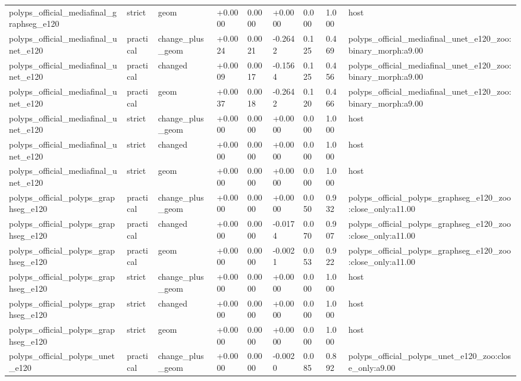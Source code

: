 \begin{table}[t]
\begin{tabular}{lllllllll}
polyps\_official\_mediafinal\_graphseg\_e120 & strict & geom & +0.0000 & 0.0000 & +0.0000 & 0.000 & 1.000 & host \\
polyps\_official\_mediafinal\_unet\_e120 & practical & change\_plus\_geom & +0.0024 & 0.0021 & -0.2642 & 0.125 & 0.469 & polyps\_official\_mediafinal\_unet\_e120\_zoo:binary\_morph:a9.00 \\
polyps\_official\_mediafinal\_unet\_e120 & practical & changed & +0.0009 & 0.0017 & -0.1564 & 0.125 & 0.456 & polyps\_official\_mediafinal\_unet\_e120\_zoo:binary\_morph:a9.00 \\
polyps\_official\_mediafinal\_unet\_e120 & practical & geom & +0.0037 & 0.0018 & -0.2642 & 0.120 & 0.466 & polyps\_official\_mediafinal\_unet\_e120\_zoo:binary\_morph:a9.00 \\
polyps\_official\_mediafinal\_unet\_e120 & strict & change\_plus\_geom & +0.0000 & 0.0000 & +0.0000 & 0.000 & 1.000 & host \\
polyps\_official\_mediafinal\_unet\_e120 & strict & changed & +0.0000 & 0.0000 & +0.0000 & 0.000 & 1.000 & host \\
polyps\_official\_mediafinal\_unet\_e120 & strict & geom & +0.0000 & 0.0000 & +0.0000 & 0.000 & 1.000 & host \\
polyps\_official\_polyps\_graphseg\_e120 & practical & change\_plus\_geom & +0.0000 & 0.0000 & +0.0000 & 0.050 & 0.932 & polyps\_official\_polyps\_graphseg\_e120\_zoo:close\_only:a11.00 \\
polyps\_official\_polyps\_graphseg\_e120 & practical & changed & +0.0000 & 0.0000 & -0.0174 & 0.070 & 0.907 & polyps\_official\_polyps\_graphseg\_e120\_zoo:close\_only:a11.00 \\
polyps\_official\_polyps\_graphseg\_e120 & practical & geom & +0.0000 & 0.0000 & -0.0021 & 0.053 & 0.922 & polyps\_official\_polyps\_graphseg\_e120\_zoo:close\_only:a11.00 \\
polyps\_official\_polyps\_graphseg\_e120 & strict & change\_plus\_geom & +0.0000 & 0.0000 & +0.0000 & 0.000 & 1.000 & host \\
polyps\_official\_polyps\_graphseg\_e120 & strict & changed & +0.0000 & 0.0000 & +0.0000 & 0.000 & 1.000 & host \\
polyps\_official\_polyps\_graphseg\_e120 & strict & geom & +0.0000 & 0.0000 & +0.0000 & 0.000 & 1.000 & host \\
polyps\_official\_polyps\_unet\_e120 & practical & change\_plus\_geom & +0.0000 & 0.0000 & -0.0020 & 0.085 & 0.892 & polyps\_official\_polyps\_unet\_e120\_zoo:close\_only:a9.00 \\

\end{tabular}
\end{table}
